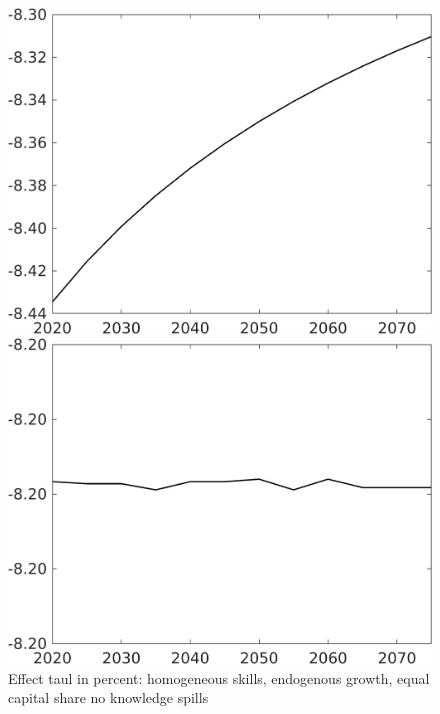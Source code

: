 \documentclass[12pt]{article}
\begin{document}
\begin{figure}[h!!]
	\centering
	\caption{Effect taul in percent: homogeneous skills, endogenous growth, equal capital share no knowledge spills}\label{fig:LF_BAU_nsk1_xgr0_equalcapShare_noknow}
	\begin{minipage}[]{0.32\textwidth}
		\includegraphics[width=1\textwidth]{../../codding_model/own_basedOnFried/optimalPol_010922_revision/figures/all_13Sept22/CompTaul_Equlab_LFBAUPer_Reg0_Emnet_spillover0_nsk1_xgr0_knspil1_sep1_countec0_GovRev0_etaa0.79.png}
	\end{minipage}	
	\begin{minipage}[]{0.32\textwidth}
		\includegraphics[width=1\textwidth]{../../codding_model/own_basedOnFried/optimalPol_010922_revision/figures/all_13Sept22/CompTaul_Equlab_LFBAUPer_Reg0_hh_spillover0_nsk1_xgr0_knspil1_sep1_countec0_GovRev0_etaa0.79.png}

\end{minipage}
\end{figure}
\end{document}

